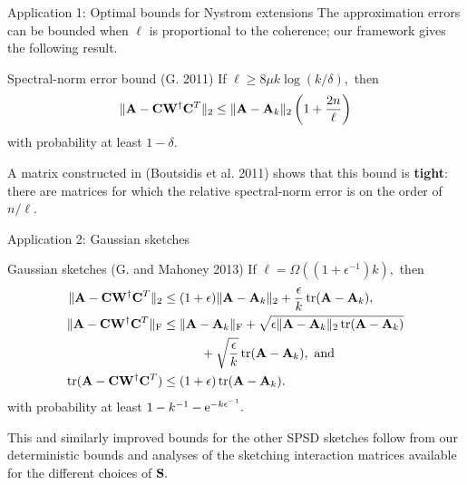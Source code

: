\documentclass[xcolor=x11names,compress,ignorenonframetext,10pt]{beamer}
\renewcommand{\(}{\begin{columns}}
\renewcommand{\)}{\end{columns}}
\newcommand{\<}[1]{\begin{column}{#1}}
\renewcommand{\>}{\end{column}}
\def\refcolor{DodgerBlue4}
\newcommand{\refer}[1]{({\color{\refcolor}#1})}
\begin{document}
%  
% 
%  
\begin{frame}{Application 1: Optimal bounds for Nystrom extensions}
  The approximation errors can be bounded when $\ell$ is proportional to the coherence; our framework
  gives the following result.
  
  \begin{block}{Spectral-norm error bound \refer{G. 2011}}
   If $\ell \geq 8 \mu k \log(k/\delta),$ then
   \[ \|\mathbf{A} - \mathbf{C} \mathbf{W}^\dagger \mathbf{C}^T\|_2 \leq \|\mathbf{A} - \mathbf{A}_k\|_2 \left(1 + \frac{2 n}{\ell} \right)\]
   with probability at least $1 - \delta.$ 
  \end{block}

  A matrix constructed in \refer{Boutsidis et al. 2011} shows that this bound is \textbf{tight}: there are matrices for which the relative
  spectral-norm error is on the order of $n/\ell.$
 \end{frame} 

 
 
 \begin{frame}{Application 2: Gaussian sketches}

  \begin{block}{Gaussian sketches \refer{G. and Mahoney 2013}}
  If $\ell = \Omega((1 + \epsilon^{-1}) k),$ then
  \begin{align*}
   \|\mathbf{A} - \mathbf{C} \mathbf{W}^\dagger \mathbf{C}^T\|_2 & \leq (1 + \epsilon) \|\mathbf{A} - \mathbf{A}_k\|_2 + \frac{\epsilon}{k}\operatorname{tr}(\mathbf{A} - \mathbf{A}_k), \\
  \|\mathbf{A} - \mathbf{C} \mathbf{W}^\dagger \mathbf{C}^T\|_{\mathrm{F}} & \leq \|\mathbf{A} - \mathbf{A}_k\|_{\mathrm{F}} + \sqrt{\epsilon \|\mathbf{A} - \mathbf{A}_k\|_2 \operatorname{tr}(\mathbf{A} - \mathbf{A}_k)} \\
  & \quad \quad \quad  + \sqrt{\frac{\epsilon}{k}}\operatorname{tr}(\mathbf{A} - \mathbf{A}_k), \text{ and} \\
   \operatorname{tr}(\mathbf{A} - \mathbf{C} \mathbf{W}^\dagger \mathbf{C}^T) & \leq (1 + \epsilon)\operatorname{tr}(\mathbf{A} - \mathbf{A}_k).
  \end{align*}
  with probability at least $1 - k^{-1} - \mathrm{e}^{-k\epsilon^{-1}}.$
  \end{block}

  This and similarly improved bounds for the other SPSD sketches follow from our deterministic bounds and analyses of the
  sketching interaction matrices available for the different choices of $\mathbf{S}.$
\end{frame}
\end{document}
